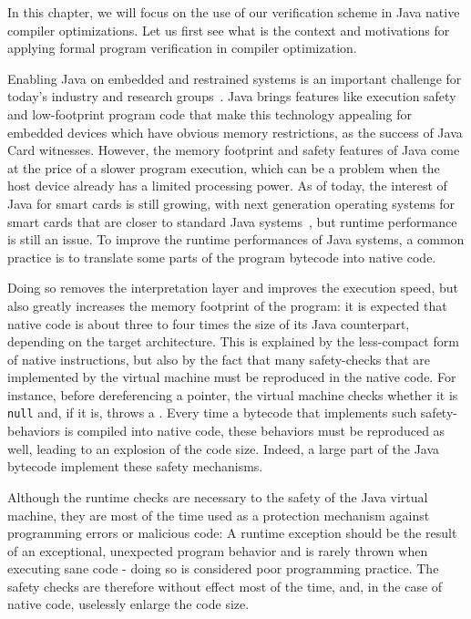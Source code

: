 

In this chapter, we will focus on the use of our verification scheme in  Java native compiler optimizations.
Let us first see what is the context and motivations for applying formal program verification in compiler optimization.

Enabling Java on embedded and restrained systems is an important challenge for today's industry and research groups~\cite{Mulchandani1998}. Java brings features like execution safety and low-footprint program code that make this technology appealing for embedded devices which have obvious memory restrictions, as the success of Java Card witnesses. However, the memory footprint and safety features of Java come at the price of a slower program execution, which can be a problem when the host device already has a limited processing power. As of today, the interest of Java for smart cards is still growing, with next generation operating systems for smart cards that are closer to standard Java systems~\cite{Lagosanto2002,Grimaud2003}, but runtime performance is still an issue. To improve the runtime performances of Java systems, a common practice is to translate some parts of the program bytecode into native code.

Doing so removes the interpretation layer and improves the execution speed, but also greatly increases the memory footprint of the program: it is expected that native code is about three to four times the size of its Java counterpart, depending on the target architecture. This is explained by the less-compact form of native instructions, but also by the fact that many safety-checks that are implemented by the virtual machine must be reproduced in the native code. For instance, before dereferencing a pointer, the virtual machine checks whether it is \texttt{null} and, if it is, throws a \NullPointerExc. Every time a bytecode that implements such safety-behaviors is compiled into native code, these behaviors must be reproduced as well, leading to an explosion of the code size. Indeed, a large part of the Java bytecode implement these safety mechanisms.

Although the runtime checks are necessary to the safety of the Java virtual machine, they are most of the time used as a protection mechanism against programming errors or malicious code: A runtime exception should be the result of an exceptional, unexpected program behavior and is rarely thrown when executing sane code - doing so is considered poor programming practice. The safety checks are therefore without effect most of the time, and, in the case of native code, uselessly enlarge the code size.

